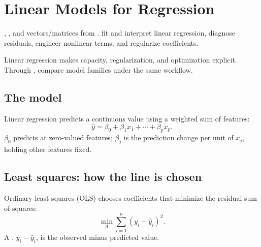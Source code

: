 \chapter{Linear Models for Regression}
\label{ch:regression}

\chapterguide%
  {, , and vectors/matrices from .}
  {fit and interpret linear regression, diagnose residuals, engineer nonlinear terms, and regularize coefficients.}

Linear regression makes capacity, regularization, and optimization explicit. Through , compare model families under the same workflow.

\section{The model}

Linear regression predicts a continuous value using a weighted sum of features:
\[
  \hat{y}=\beta_0+\beta_1x_1+\cdots+\beta_{p}x_{p}.
\]
$\beta_0$ predicts at zero-valued features; $\beta_j$ is the prediction change per unit of $x_j$, holding other features fixed.

\section{Least squares: how the line is chosen}

Ordinary least squares (OLS) chooses coefficients that minimize the residual sum of squares:
\[
  \min_{\bm{\beta}}
  \sum_{i=1}^{n}{(y_i-\hat{y}_i)}^2.
\]
A , $y_i-\hat y_i$, is the observed minus predicted value.

\begin{mlfigure}
\end{mlfigure}

